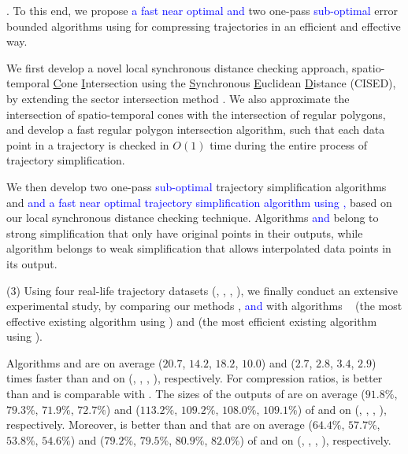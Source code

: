 .
To this end, we propose \textcolor{blue}{a fast near optimal and} two one-pass \textcolor{blue}{sub-optimal} error bounded \lsa algorithms using \sed for compressing trajectories in an efficient and effective way. %

 We first develop a novel local synchronous distance checking approach, \ie spatio-temporal \underline{C}one \underline{I}ntersection using the \underline{S}ynchronous \underline{E}uclidean \underline{D}istance (CISED), by extending the sector intersection method \cite{Williams:Longest, Sklansky:Cone, Zhao:Sleeve}. We also approximate the intersection of spatio-temporal cones with the intersection of regular polygons, and develop a fast regular polygon intersection algorithm, such that each data point in a trajectory is checked in $O(1)$ time during the entire process of trajectory simplification.

 We then develop two one-pass \textcolor{blue}{sub-optimal} trajectory simplification algorithms \cist and \cista \textcolor{blue}{and a fast near optimal trajectory simplification algorithm \cisto using \sed,} based on our local synchronous distance checking technique. 
Algorithms \cist\textcolor{blue}{and \cisto} belong to strong simplification that only have original points in their outputs, while algorithm \cista belongs to weak simplification that allows interpolated data points in its output.


\sstab (3) Using four real-life trajectory datasets (\truck, \sercar, \geolife, \pricar),
we finally conduct an extensive experimental study, by comparing our methods \cist, \cista \textcolor{blue}{and \cisto} with algorithms \dps~\cite{Meratnia:Spatiotemporal} (the most effective existing \lsa algorithm using \sed) and \squishe \cite{Muckell:Compression} (the most efficient existing \lsa algorithm using \sed).

Algorithms \cist and \cista are on average ($20.7$, $14.2$, $18.2$, $10.0$) and ($2.7$, $2.8$, $3.4$, {$2.9$}) times faster than \dps and \squishe on (\truck, \sercar, \geolife, \pricar), respectively.
%
For compression ratios, \cist is better than \squishe and is comparable with \dps. The sizes of the outputs of \cist are on average ($91.8\%$, $79.3\%$, $71.9\%$, {$72.7\%$}) and ($113.2\%$, $109.2\%$, $108.0\%$, $109.1\%$) of \squishe and \dps on (\truck, \sercar, \geolife, \pricar), respectively. Moreover, \cista is better than \squishe and \dps that are on average ($64.4\%$, $57.7\%$, $53.8\%$, {$54.6\%$}) and ($79.2\%$, $79.5\%$, $80.9\%$, $82.0\%$) of \squishe and \dps on (\truck, \sercar, \geolife, \pricar), respectively.


